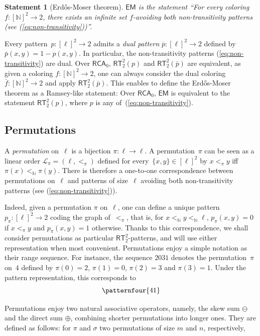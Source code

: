 \documentclass{article}
\numberwithin{theorem}{section}
\newtheorem{statement}[theorem]{Statement}
\def\L{\mathcal{L}}
\newcommand{\RCA}[0]{\mathsf{RCA}}
\newcommand{\EM}[0]{\mathsf{EM}}
\newcommand{\RT}[0]{\mathsf{RT}}
\newcommand{\NN}[0]{\mathbb{N}}
\def\qt#1{``#1''}%
\def\qt#1{``#1''}%
\begin{document}
\begin{statement}[Erd\H{o}s-Moser theorem]
$\EM$ is the statement \qt{For every coloring $f : [\NN]^2 \to 2$, there exists an infinite set $f$-avoiding both non-transitivity patterns (see (\ref{eq:non-transitivity}))}. 
\end{statement}

Every pattern~$p : [\ell]^2 \to 2$ admits a \emph{dual pattern} $\overline{p} : [\ell]^2 \to 2$ defined by $\bar p(x, y) = 1-p(x,y)$. In particular, the non-transitivity patterns (\ref{eq:non-transitivity}) are dual. Over $\RCA_0$, $\RT^2_2(p)$ and $\RT^2_2(\bar p)$ are equivalent, as given a coloring $f : [\NN]^2 \to 2$, one can always consider the dual coloring $\bar f : [\NN]^2 \to 2$ and apply $\RT^2_2(\bar p)$. This enables to define the Erd\H{o}s-Moser theorem as a Ramsey-like statement: Over $\RCA_0$, $\EM$ is equivalent to the statement $\RT^2_2(p)$, where $p$ is any of~(\ref{eq:non-transitivity}).

\subsection{Permutations}

A \emph{permutation} on~$\ell$ is a bijection $\pi : \ell \to \ell$. A permutation~$\pi$ can be seen as a linear order $\L_\pi = (\ell, <_\pi)$ defined for every~$\{x, y\} \in [\ell]^2$ by $x <_\pi y$ iff $\pi(x) <_\NN \pi(y)$.
There is therefore a one-to-one correspondence between permutations on~$\ell$ and patterns of size~$\ell$ avoiding both non-transitivity patterns (see (\ref{eq:non-transitivity})).

Indeed, given a permutation $\pi$ on~$\ell$, one can define a unique pattern~$p_\pi : [\ell]^2 \to 2$
coding the graph of~$<_\pi$, that is, for $x <_\NN y <_\NN \ell$, $p_\pi(x, y) = 0$ if $x <_\pi y$ and $p_\pi(x, y) = 1$ otherwise. Thanks to this correspondence, we shall consider permutations as particular $\RT^2_2$-patterns, and will use either representation when most convenient. Permutations enjoy a simple notation as their range sequence. For instance, the sequence $2031$ denotes the permutation~$\pi$ on~$4$ defined by $\pi(0) = 2$, $\pi(1) = 0$, $\pi(2) = 3$ and $\pi(3) = 1$. Under the pattern representation, this corresponds to
\vspace{1.3cm}
\begin{equation}\label{eq:pattern-2031}
\patternfour{41}    
\end{equation}

Permutations enjoy two natural associative operators, namely, the skew sum $\ominus$ and the direct sum $\oplus$, combining shorter permutations into longer ones. They are defined as follows: for $\pi$ and $\sigma$ two permutations of size $m$ and $n$, respectively,
\end{document}
